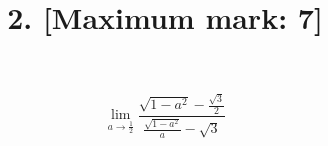 \documentclass[10pt]{article}
\title{2. [Maximum mark: 7] }
\author{}
\date{}
\begin{document}
\maketitle



\[\lim_{a\to\frac 12}\frac{\sqrt{1-a^{2}}-\frac{\sqrt{3}}{2}}{\frac{\sqrt{1-a^{2}}}{a}-\sqrt{3}}\]
\end{document}
